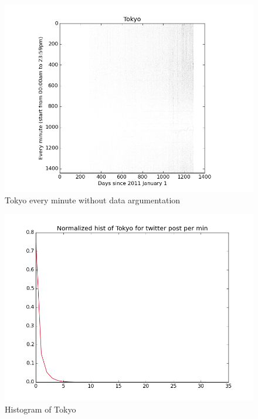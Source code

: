 \documentclass[a4paper,12pt]{article}
\begin{document}
 


  \begin{figure}[H]
  \begin{center}
      \includegraphics[scale=0.8]{Tokyo.png}
\end{center}
\caption{Tokyo every minute without data argumentation}
 \label {fig:2}
 \end{figure}
 
 
   \begin{figure}[H]
  \begin{center}
      \includegraphics[scale=0.8]{Tokyohisto.png}
\end{center}
\caption{Histogram of Tokyo}
 \label {fig:2}
 \end{figure}
 
\end{document}
